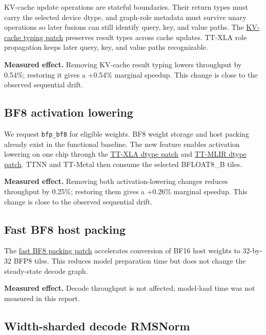 \documentclass[
  10pt,
  american,
  10pt,
  letterpaper]{article}
\begin{document}
KV-cache update operations are stateful boundaries. Their return types
must carry the selected device dtype, and graph-role metadata must
survive unary operations so later fusions can still identify query, key,
and value paths. The
\href{../../third_party/tt_xla/tt_mlir_kv_cache_dtype_return_types.patch}{KV-cache
typing patch} preserves result types across cache updates. TT-XLA role
propagation keeps later query, key, and value paths recognizable.

\textbf{Measured effect.} Removing KV-cache result typing lowers
throughput by 0.54\%; restoring it gives a +0.54\% marginal speedup.
This change is close to the observed sequential drift.

\hypertarget{bf8-activation-lowering}{%
\subsection{BF8 activation lowering}\label{bf8-activation-lowering}}

We request \texttt{bfp\_bf8} for eligible weights. BF8 weight storage
and host packing already exist in the functional baseline. The new
feature enables activation lowering on one chip through the
\href{../../third_party/tt_xla/tt_xla_enable_bf8_activation_dtype_lowering.patch}{TT-XLA
dtype patch} and
\href{../../third_party/tt_xla/tt_mlir_single_chip_activation_dtype_lowering.patch}{TT-MLIR
dtype patch}. TTNN and TT-Metal then consume the selected BFLOAT8\_B
tiles.

\textbf{Measured effect.} Removing both activation-lowering changes
reduces throughput by 0.25\%; restoring them gives a +0.26\% marginal
speedup. This change is close to the observed sequential drift.

\hypertarget{fast-bf8-host-packing}{%
\subsection{Fast BF8 host packing}\label{fast-bf8-host-packing}}

The \href{../../third_party/tt_metal/fast_bfloat16_bfp8_pack.patch}{fast
BF8 packing patch} accelerates conversion of BF16 host weights to
32-by-32 BFP8 tiles. This reduces model preparation time but does not
change the steady-state decode graph.

\textbf{Measured effect.} Decode throughput is not affected; model-load
time was not measured in this report.

\hypertarget{width-sharded-decode-rmsnorm}{%
\subsection{Width-sharded decode
RMSNorm}\label{width-sharded-decode-rmsnorm}}
\end{document}
